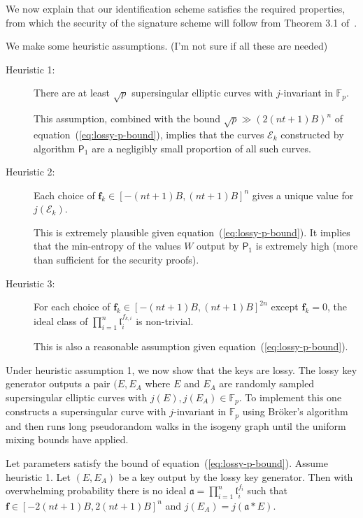 \documentclass{llncs}
\newcommand{\E}{\mathcal{E}}
\newcommand{\F}{\mathbb{F}}
\renewcommand{\a}{\mathfrak{a}}
\renewcommand{\l}{\mathfrak{l}}
\newcommand{\f}{\mathbf{f}}
\newcommand{\PP}{\mathsf{P}}
\begin{document}
We now explain that our identification scheme satisfies the required properties, from which the security of the signature scheme will follow from Theorem 3.1 of~\cite{KLS18}.

We make some heuristic assumptions.
(I'm not sure if all these are needed)
\begin{description}
\item[Heuristic 1:] There are at least $\sqrt{p}$ supersingular elliptic curves with $j$-invariant in $\F_p$.

This assumption, combined with the bound $\sqrt{p} \gg (2(nt+1)B)^n $ of equation~(\ref{eq:lossy-p-bound}), implies that the curves $\E_k$ constructed by algorithm $\PP_1$ are a negligibly small proportion of all such curves.

\item[Heuristic 2:] Each choice of $\f_k \in [-(nt+1)B,(nt+1)B]^n$ gives a unique value for $j(\E_k)$.

This is extremely plausible given equation~(\ref{eq:lossy-p-bound}). It implies that the min-entropy of the values $W$ output by $\PP_1$ is extremely high (more than sufficient for the security proofs).

\item[Heuristic 3:] For each choice of $\f_k \in [-(nt+1)B,(nt+1)B]^{2n}$ except $\f_k = 0$, the ideal class of $\prod_{i=1}^n \l_i^{f_{k,i}}$ is non-trivial.

This is also a reasonable assumption given equation~(\ref{eq:lossy-p-bound}).
\end{description}

Under heuristic assumption 1, we now show that the keys are lossy.
The lossy key generator outputs a pair $(E,E_A$ where $E$ and $E_A$ are randomly sampled supersingular elliptic curves with $j(E), j(E_A) \in \F_p$.
To implement this one constructs a supersingular curve with $j$-invariant in $\F_p$ using Br{\" o}ker's algorithm~\cite{Bro09} and then runs long pseudorandom walks in the isogeny graph until the uniform mixing bounds have applied.

\begin{lemma}\label{lem:isogeny count}
Let parameters satisfy the bound of equation~(\ref{eq:lossy-p-bound}). Assume heuristic 1. Let $(E,E_A)$ be a key output by the lossy key generator. Then with overwhelming probability there is no ideal $\a = \prod_{i=1}^n \l_i^{f_{i}}$ such that $\f \in [-2(nt+1)B,2(nt+1)B]^{n}$ and $j(E_A) = j( \a * E )$.
\end{lemma}
\end{document}
